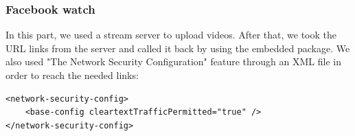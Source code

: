 \subsubsection{Facebook watch}
\hspace{0.7cm}In this part, we used a stream server to upload videos. After that, we took the URL links from the server and called it back by using the embedded package. We also used "The Network Security Configuration" feature through an XML file in order to reach the needed links:

\begin{verbatim}
<network-security-config>
    <base-config cleartextTrafficPermitted="true" />
</network-security-config>
\end{verbatim}





